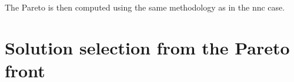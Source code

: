 The Pareto is then computed using the same methodology as in the \gls{nnc} case.
\section{Solution selection from the Pareto front}
\label{sec:Selection}

%
